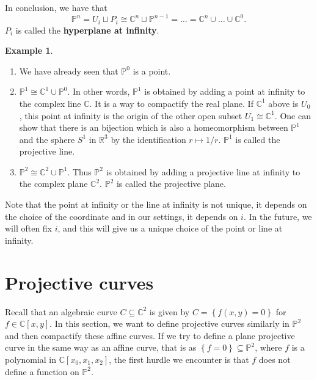 \documentclass{article}
\newcommand{\R}{\mathbb{R}}
\newcommand{\C}{\mathbb{C}}
\renewcommand{\P}{\mathbb{P}}
\newcommand{\rb}[1]{\left( #1 \right)}
\renewcommand{\sb}[1]{\left[ #1 \right]}
\newcommand{\cb}[1]{\left\{ #1 \right\}}
\theoremstyle{definition}\newtheorem{definition}{Definition}[section]
\theoremstyle{definition}\newtheorem{notation}[definition]{Notation}
\theoremstyle{definition}\newtheorem{remark}[definition]{Remark}
\theoremstyle{definition}\newtheorem{example}[definition]{Example}
\theoremstyle{definition}\newtheorem{fact}{Fact}
\theoremstyle{definition}\newtheorem{exercise}{Exercise}
\begin{document}
In conclusion, we have that
$$ \P^n = U_i \sqcup P_i \cong \C^n \sqcup \P^{n - 1} = \dots = \C^n \cup \dots \cup \C^0. $$
$ P_i $ is called the \textbf{hyperplane at infinity}.

\begin{example}
\hfill
\begin{enumerate}
\item We have already seen that $ \P^0 $ is a point.
\item $ \P^1 \cong \C^1 \cup \P^0 $. In other words, $ \P^1 $ is obtained by adding a point at infinity to the complex line $ \C $. It is a way to compactify the real plane. If $ \C^1 $ above is $ U_0 $, this point at infinity is the origin of the other open subset $ U_1 \cong \C^1 $. One can show that there is an bijection which is also a homeomorphism between $ \P^1 $ and the sphere $ S^1 $ in $ \R^3 $ by the identification $ r \mapsto 1 / r $. $ \P^1 $ is called the projective line.
\item $ \P^2 \cong \C^2 \cup \P^1 $. Thus $ \P^2 $ is obtained by adding a projective line at infinity to the complex plane $ \C^2 $. $ \P^2 $ is called the projective plane.
\end{enumerate}
\end{example}

Note that the point at infinity or the line at infinity is not unique, it depends on the choice of the coordinate and in our settings, it depends on $ i $. In the future, we will often fix $ i $, and this will give us a unique choice of the point or line at infinity.


\section{Projective curves}

Recall that an algebraic curve $ C \subseteq \C^2 $ is given by $ C = \cb{f\rb{x, y} = 0} $ for $ f \in \C\sb{x, y} $. In this section, we want to define projective curves similarly in $ \P^2 $ and then compactify these affine curves. If we try to define a plane projective curve in the same way as an affine curve, that is as $ \cb{f = 0} \subseteq \P^2 $, where $ f $ is a polynomial in $ \C\sb{x_0, x_1, x_2} $, the first hurdle we encounter is that $ f $ does not define a function on $ \P^2 $.
\end{document}
